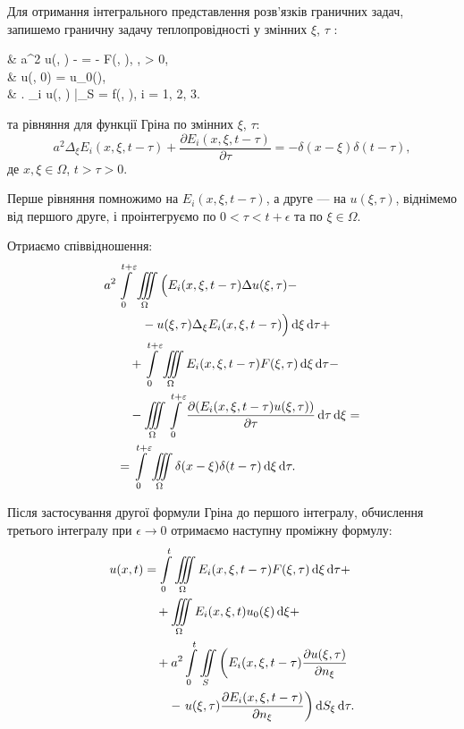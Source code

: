 Для отримання інтегрального представлення розв'язків граничних задач, запишемо граничну задачу теплопровідності у змінних $\xi$, $\tau$ :
\begin{system}
	& a^2 \Delta u(\xi, \tau) -  = - F(\xi, \tau), \quad \xi \in \Omega, \quad \tau > 0, \\
	& u(\xi, 0) = u_0(\xi), \\
	& \left. \ell_i u(\xi, \tau) \right|_{\xi \in S} = f(\xi, \tau), \quad i = 1, 2, 3. 
\end{system}
та рівняння для функції Гріна по змінних $\xi$, $\tau$:
\begin{equation}
	a^2 \Delta_\xi E_i(x, \xi, t - \tau) + \frac{\partial E_i(x, \xi, t - \tau)}{\partial \tau} = - \delta(x - \xi) \delta(t - \tau),
\end{equation}
де $x, \xi \in \Omega$, $ t > \tau > 0$. \medskip

Перше рівняння помножимо на $E_i(x, \xi, t - \tau)$, а друге --- на $u(\xi, \tau)$, віднімемо від першого друге, і проінтегруємо по $0 < \tau < t + \epsilon$ та по $\xi \in \Omega$. \medskip

Отриаємо співвідношення:
\begin{equation}
	\begin{aligned}
		& a^2 \Int_0^{t + \epsilon} \Iiint_\Omega \Big( E_i(x, \xi, t - \tau) \Delta u(\xi, \tau) - \\
		& \qquad \quad - u(\xi, \tau) \Delta_\xi E_i(x, \xi, t - \tau) \Big) \diff \xi \diff \tau + \\
		& \qquad + \Int_0^{t + \epsilon} \Iiint_\Omega E_i(x, \xi, t - \tau) F(\xi, \tau) \diff \xi \diff \tau - \\
		& \qquad - \Iiint_\Omega \Int_0^{t+\epsilon} \frac{\partial (E_i(x, \xi, t - \tau) u(\xi, \tau))}{\partial \tau} \diff \tau \diff \xi = \\
		& \quad = \Int_0^{t + \epsilon} \Iiint_\Omega \delta(x - \xi) \delta(t - \tau) \diff \xi \diff \tau.
	\end{aligned}
\end{equation}

Після застосування другої формули Гріна до першого інтегралу, обчислення третього інтегралу при $\epsilon \to 0$ отримаємо наступну проміжну формулу:
\begin{equation}
	\begin{aligned}
		u(x, t) &= \displaystyle\int\limits_0^t \displaystyle\iiint\limits_\Omega E_i(x, \xi, t - \tau) F(\xi, \tau) \mathop{}\!\mathrm{d} \xi \mathop{}\!\mathrm{d} \tau + \\
		& \quad + \displaystyle\iiint\limits_\Omega E_i(x, \xi, t) u_0(\xi) \mathop{}\!\mathrm{d} \xi + \\
		& \quad + a^2 \displaystyle\int\limits_0^t \displaystyle\iint\limits_S \left( E_i(x, \xi, t - \tau) \frac{\partial u(\xi, \tau)}{\partial n_\xi} \right. \\
		& \qquad - \left. u(\xi, \tau) \frac{\partial E_i(x, \xi, t - \tau)}{\partial n_\xi} \right) \mathop{}\!\mathrm{d} S_\xi \mathop{}\!\mathrm{d} \tau.
	\end{aligned}
\end{equation}

